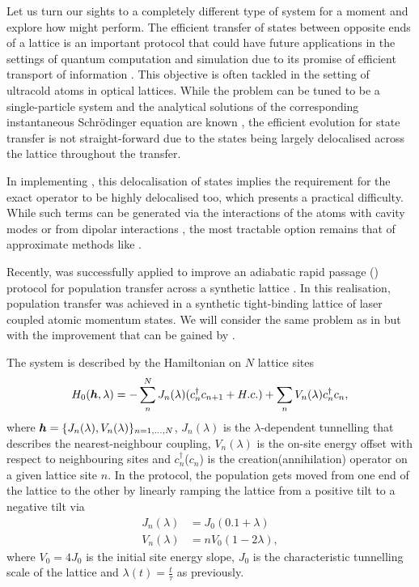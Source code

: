 Let us turn our sights to a completely different type of system for a moment and explore how  might perform. The efficient transfer of states between opposite ends of a lattice is an important protocol that could have future applications in the settings of quantum computation and simulation due to its promise of efficient transport of information \cite{lang_topological_2017}. This objective is often tackled in the setting of ultracold atoms in optical lattices. While the problem can be tuned to be a single-particle system and the analytical solutions of the corresponding instantaneous Schr\"odinger equation are known \cite{hatsugai_chern_1993,hugel_chiral_2014}, the efficient evolution for state transfer is not straight-forward due to the states being largely delocalised across the lattice throughout the transfer. 

In implementing , this delocalisation of states implies the requirement for the exact  operator to be highly delocalised too, which presents a practical difficulty. While such terms can be generated via the interactions of the atoms with cavity modes \cite{landig_quantum_2016,keller_phases_2017} or from dipolar interactions \cite{baranov_ultracold_2002, trefzger_ultracold_2011}, the most tractable option remains that of approximate methods like .

Recently,  was successfully applied to improve an adiabatic rapid passage () protocol for population transfer across a synthetic lattice \cite{meier_counterdiabatic_2020}. In this realisation, population transfer was achieved in a synthetic tight-binding lattice of laser coupled atomic momentum states. We will consider the same problem as in \cite{meier_counterdiabatic_2020} but with the improvement that can be gained by . 

The system is described by the Hamiltonian on $N$ lattice sites
\begin{equation}\label{eq:lattice_hamiltonian}
    H_0(\boldsymbol{h}, \lambda) = - \sum_n^N J_n(\lambda)(c_n^{\dag}c_{n+1} + H.c.) + \sum_n V_n(\lambda) c_n^{\dag}c_n,
\end{equation}
where $\boldsymbol{h} = \{ J_n(\lambda), V_n(\lambda)\}_{n = 1, ..., N}$, $J_n(\lambda)$ is the $\lambda$-dependent tunnelling that describes the nearest-neighbour coupling, $V_n(\lambda)$ is the on-site energy offset with respect to neighbouring sites and $c_n^{\dag}$($c_{n}$) is the creation(annihilation) operator on a given lattice site $n$. In the  protocol, the population gets moved from one end of the lattice to the other by linearly ramping the lattice from a positive tilt to a negative tilt via
\begin{equation} \label{eq:J_lattice}
    \begin{aligned}
        J_n(\lambda) &= J_0(0.1 + \lambda) \\
        V_n(\lambda) &= n V_0 (1 - 2\lambda),
    \end{aligned}
\end{equation}
where $V_0 = 4J_0$ is the initial site energy slope, $J_0$ is the characteristic tunnelling scale of the lattice and $\lambda(t) = \frac{t}{\tau}$ as previously.

